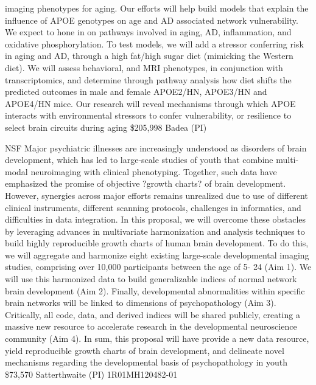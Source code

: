 \documentclass[10pt,colorlinks=true,urlcolor=blue]{moderncv}
\begin{document}
{        imaging phenotypes for aging.  Our efforts will help build
        models that explain the influence of APOE genotypes on age and
        AD associated network vulnerability. We expect to hone in on
        pathways involved in aging, AD, inflammation, and oxidative
        phosphorylation. To test models, we will add a stressor
        conferring risk in aging and AD, through a high fat/high sugar
        diet (mimicking the Western diet). We will assess behavioral,
        and MRI phenotypes, in conjunction with transcriptomics, and
        determine through pathway analysis how diet shifts the predicted
        outcomes in male and female APOE2/HN, APOE3/HN and APOE4/HN
        mice.  Our research will reveal mechanisms through which APOE
        interacts with environmental stressors to confer vulnerability,
        or resilience to select brain circuits during aging 
    }
    {\$205,998}
    {Badea (PI)}{}

        
%
    {NSF}%
    {
    Major psychiatric illnesses are increasingly understood as disorders of brain development, which has led to large-scale studies of youth that combine multi-modal neuroimaging with clinical phenotyping. Together, such data have emphasized the promise of objective ?growth charts? of brain development.  However, synergies across major efforts remains unrealized due to use of different clinical instruments, different scanning protocols, challenges in informatics, and difficulties in data integration. In this proposal, we will overcome these obstacles by leveraging advances in multivariate harmonization and analysis techniques to build highly reproducible growth charts of human brain development. To do this, we will aggregate and harmonize eight existing large-scale developmental imaging studies, comprising over 10,000 participants between the age of 5- 24 (Aim 1). We will use this harmonized data to build generalizable indices of normal network brain development (Aim 2). Finally, developmental abnormalities within specific brain networks will be linked to dimensions of psychopathology (Aim 3). Critically, all code, data, and derived indices will be shared publicly, creating a massive new resource to accelerate research in the developmental neuroscience community (Aim 4). In sum, this proposal will have provide a new data resource, yield reproducible growth charts of brain development, and delineate novel mechanisms regarding the developmental basis of psychopathology in youth
    }
    {\$73,570}
    {Satterthwaite (PI) 1R01MH120482-01}{}
\end{document}
